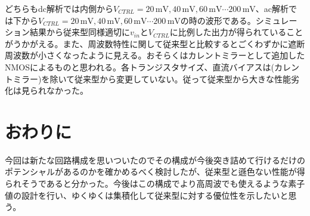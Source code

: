 \documentclass[twocolumn]{jsarticle}
\begin{document}
    どちらもdc解析では内側から$V_{CTRL}=20\,\mathrm{mV},40\,\mathrm{mV},60\,\mathrm{mV}\cdots200\,\mathrm{mV}$、ac解析では下から$V_{CTRL}=20\,\mathrm{mV},40\,\mathrm{mV},60\,\mathrm{mV}\cdots200\,\mathrm{mV}$の時の波形である。シミュレーション結果から従来型同様適切に$v_{in}$と$V_{CTRL}$に比例した出力が得られていることがうかがえる。また、周波数特性に関して従来型と比較するとごくわずかに遮断周波数が小さくなったように見える。おそらくはカレントミラーとして追加したNMOSによるものと思われる。各トランジスタサイズ、直流バイアスは(カレントミラー)を除いて従来型から変更していない。従って従来型から大きな性能劣化は見られなかった。


\section{おわりに}
    今回は新たな回路構成を思いついたのでその構成が今後突き詰めて行けるだけのポテンシャルがあるのかを確かめるべく検討したが、従来型と遜色ない性能が得られそうであると分かった。今後はこの構成でより高周波でも使えるような素子値の設計を行い、ゆくゆくは集積化して従来型に対する優位性を示したいと思う。
\end{document}
